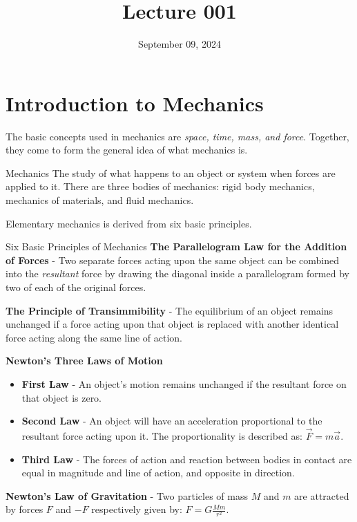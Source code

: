 \documentclass[12pt]{article}
\title{Lecture 001}
\date{September 09, 2024}
\begin{document}
\section{Introduction to Mechanics}
\label{sec:introductionToMechanics}

The basic concepts used in mechanics are \textit{space, time, mass, and force}. Together,
they come to form the general idea of what mechanics is.

\begin{definition}{Mechanics}
  The study of what happens to an object or system when forces are applied to it.
  There are three bodies of mechanics: rigid body mechanics, mechanics of materials,
  and fluid mechanics.
\end{definition}

Elementary mechanics is derived from six basic principles.

\begin{definition}{Six Basic Principles of Mechanics}
  \textbf{The Parallelogram Law for the Addition of Forces} - Two separate forces acting upon
  the same object can be combined into the \textit{resultant} force by drawing the diagonal
  inside a parallelogram formed by two of each of the original forces.

  \textbf{The Principle of Transimmibility} - The equilibrium of an object remains unchanged
  if a force acting upon that object is replaced with another identical force acting along
  the same line of action.

  \textbf{Newton's Three Laws of Motion}
  \begin{itemize}
    \itemsep0em
    \item \textbf{First Law} - An object's motion remains unchanged if the resultant force
      on that object is zero.
    \item \textbf{Second Law} - An object will have an acceleration proportional to the resultant
      force acting upon it. The proportionality is described as: $\overrightarrow{F}=m \overrightarrow{a}$.
    \item \textbf{Third Law} - The forces of action and reaction between bodies in contact are 
      equal in magnitude and line of action, and opposite in direction.
  \end{itemize}

  \textbf{Newton's Law of Gravitation} - Two particles of mass $M$ and $m$ are attracted
  by forces $F$ and $-F$ respectively given by: $F=G \frac{Mm}{r^2}$.
\end{definition}
\end{document}
